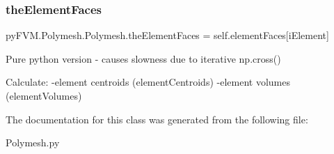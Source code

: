 \subsubsection{\texorpdfstring{theElementFaces}{theElementFaces}}
{\footnotesize\ttfamily py\+F\+V\+M.\+Polymesh.\+Polymesh.\+the\+Element\+Faces = self.\+element\+Faces\mbox{[}i\+Element\mbox{]}\hspace{0.3cm}{\ttfamily [static]}}

\begin{DoxyVerb}Pure python version - causes slowness due to iterative np.cross()
\end{DoxyVerb}
\begin{DoxyVerb}Calculate:
    -element centroids (elementCentroids)
    -element volumes (elementVolumes)
\end{DoxyVerb}
 

The documentation for this class was generated from the following file\+:\begin{DoxyCompactItemize}
\item 
Polymesh.\+py\end{DoxyCompactItemize}
